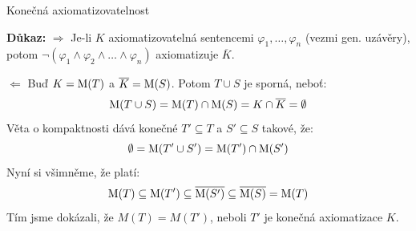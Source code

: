 \documentclass{beamer}
\begin{document}
\begin{frame}{Konečná axiomatizovatelnost}
    
    \smallskip

    \pause

    \pause
    \textbf{Důkaz:} \alert{\Large$\Rightarrow$}
    Je-li $K$ axiomatizovatelná \alert{sentencemi} $\varphi_1,\dots,\varphi_n$ (vezmi gen. uzávěry), potom $\neg(\varphi_1\land\varphi_2\land\dots\land\varphi_n)$ axiomatizuje $\overline{K}$.\pause

    \alert{\Large$\Leftarrow$} Buď $K=\operatorname{M}(T)$ a $\overline{K}=\operatorname{M}(S)$. Potom  \alert{$T\cup S$ je sporná}, neboť:
    $$
    \operatorname{M}(T\cup S)=\operatorname{M}(T)\cap \operatorname{M}(S)=K\cap\overline{K}=\emptyset
    $$
    \pause \alert{Věta o kompaktnosti} dává konečné $T'\subseteq T$ a $S'\subseteq S$ takové, že:
    $$
    \emptyset = \operatorname{M}(T'\cup S')=\operatorname{M}(T')\cap \operatorname{M}(S')
    $$
    \pause Nyní si všimněme, že platí:
    $$
    \operatorname{M}(T)\subseteq \operatorname{M}(T')\subseteq \overline{\operatorname{M}(S')}\subseteq \overline{\operatorname{M}(S)}=\operatorname{M}(T)
    $$
    \pause Tím jsme dokázali, že \alert{$M(T)=M(T')$}, neboli $T'$ je konečná axiomatizace $K$. \hfill\qedsymbol

\end{frame}
\end{document}
